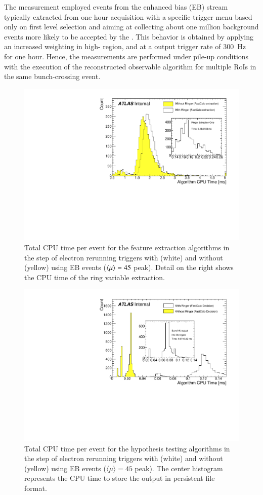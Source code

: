 The measurement employed events from the enhanced bias (EB)
stream~\cite{eb_description} typically extracted from one hour acquisition with
a specific trigger menu based only on first level selection and aiming at
collecting about one million background events more likely to be accepted by the
\hlt{}. This behavior is obtained by applying an increased weighting in high-\pt{} region,
and at a output trigger rate of \SI{300}{\hertz}~\cite{eb_specifications} for one hour. Hence, the
measurements are performed under pile-up conditions with the execution of the
reconstructed observable algorithm for multiple RoIs in the same bunch-crossing event.


\begin{figure}[h!tb]
	\includegraphics[width=.7\textwidth]{sections/05_analysis/figures/EgammaFex_TotalTime}
	\centering
	\caption{\label{fig:fastcalo_fex_time}
		Total CPU time per event for the feature extraction algorithms in the \fastcalo step of electron rerunning triggers with (white) and without (yellow) \rnn{} using EB events ($\langle \mu \rangle=45$ peak). Detail on the right shows the CPU time of the ring variable extraction.  
	}
\end{figure}

\begin{figure}[h!tb]
	\includegraphics[width=.7\textwidth]{sections/05_analysis/figures/EgammaHypo_TotalTime.pdf}
	\centering
	\caption{\label{fig:fastcalo_hypo_time}
		Total CPU time per event for the hypothesis testing algorithms
		in the \fastcalo step of electron rerunning triggers with (white) and without (yellow) \rnn{} using EB events ($\langle \mu \rangle = 45$ peak). The center histogram represents the CPU time to store the \rnn{} output in persistent file format.}
\end{figure}

